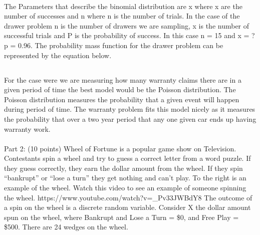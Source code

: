 \documentclass[letterpaper, onecolumn,10pt]{IEEEtran}
\begin{document}
		        \paragraph{}
		        The Parameters that describe the binomial distribution are x where x are the number of successes and n where n is the number of trials. In the case of the drawer problem n is the number of drawers we are sampling, x is the number of successful trials and P is the probability of success. In this case n = 15 and x = ? p = 0.96. The probability mass function for the drawer problem can be represented by the equation below.\\
		        
		        
		            
            \subsection{}
                \paragraph{}
                For the case were we are measuring how many warranty claims there are in a given period of time the best model would be the Poisson distribution. The Poisson distribution measures the probability that a given event will happen during period of time. The warranty problem fits this model nicely as it measures the probability that over a two year period that any one given car ends up having warranty work.\\
                
                \paragraph{}
                
		\iffalse
Part 2: (10 points) Wheel of Fortune is a popular game show on Television.
Contestants spin a wheel and try to guess a correct letter from a word puzzle. If
they guess correctly, they earn the dollar amount from the wheel. If they spin
“bankrupt” or “lose a turn” they get nothing and can’t play. To the right is an
example of the wheel. Watch this video to see an example of someone spinning
the wheel. https://www.youtube.com/watch?v=\_Pv33JWBdY8
The outcome of a spin on the wheel is a discrete random variable. Consider X
the dollar amount spun on the wheel, where Bankrupt and Lose a Turn = \$0, and
Free Play = \$500. There are 24 wedges on the wheel. 
\end{document}
